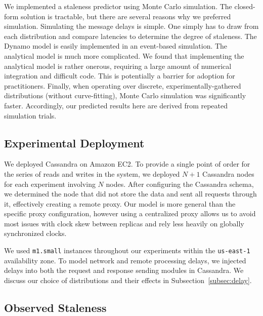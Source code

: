 \documentclass{vldb}
\begin{document}
We implemented a staleness predictor using Monte Carlo simulation.
The closed-form solution is tractable, but there are several reasons
why we preferred simulation.  Simulating the message delays is simple.
One simply has to draw from each distribution and compare latencies to
determine the degree of staleness.  The Dynamo model is easily
implemented in an event-based simulation.  The analytical model is
much more complicated.  We found that implementing the analytical
model is rather onerous, requiring a large amount of numerical
integration and difficult code.  This is potentially a barrier for
adoption for practitioners.  Finally, when operating over discrete,
experimentally-gathered distributions (without curve-fitting), Monte
Carlo simulation was significantly faster.  Accordingly, our predicted
results here are derived from repeated simulation trials.

\subsection{Experimental Deployment}

We deployed Cassandra on Amazon EC2.  To provide a single point of
order for the series of reads and writes in the system, we deployed
$N+1$ Cassandra nodes for each experiment involving $N$ nodes.  After
configuring the Cassandra schema, we determined the node that did not
store the data and sent all requests through it, effectively creating
a remote proxy.  Our model is more general than the specific proxy
configuration, however using a centralized proxy allows us to avoid
most issues with clock skew between replicas and rely less heavily on
globally synchronized clocks.

We used \texttt{m1.small} instances throughout our experiments within
the \texttt{us-east-1} availability zone.  To model network and remote
processing delays, we injected delays into both the request and
response sending modules in Cassandra.  We discuss our choice of
distributions and their effects in Subsection~\ref{subsec:delay}.

\subsection{Observed Staleness}
\end{document}
